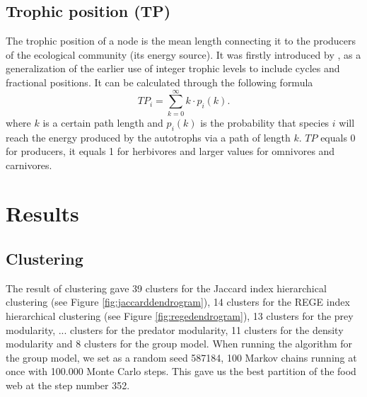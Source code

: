 \documentclass[twocolumn]{article}
\begin{document}
	\subsection*{Trophic position (TP)}
		The trophic position of a node is the mean length connecting it to the producers of the ecological community (its energy source). It was firstly introduced by \citet{Levine1980}, as a generalization of the earlier use of integer trophic levels to include cycles and fractional positions. It can be calculated through the following formula
		\begin{equation}
			TP_i=\sum\limits_{k=0}^\infty k \cdot p_i(k).
		\end{equation}
		where $k$ is a certain path length and $p_i(k)$ is the probability that species $i$ will reach the energy produced by the autotrophs via a path of length $k$. $TP$ equals 0 for producers, it equals 1 for herbivores and larger values for omnivores and carnivores.
\section*{Results}
	\subsection*{Clustering}
	The result of clustering gave 39 clusters for the Jaccard index hierarchical clustering (see Figure \ref{fig:jaccarddendrogram}), 14 clusters for the REGE index hierarchical clustering (see Figure \ref{fig:regedendrogram}), 13 clusters for the prey modularity, ... clusters for the predator modularity, 11 clusters for the density modularity and 8 clusters for the group model. When running the algorithm for the group model, we set as a random seed 587184, 100 Markov chains running at once with 100.000 Monte Carlo steps. This gave us the best partition of the food web at the step number 352.
\end{document}
